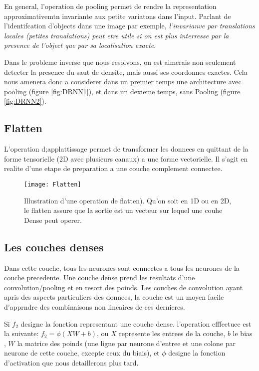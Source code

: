 En general, l'operation de pooling permet de rendre la representation approximativemtn invariante aux petite variatons dans l'input. Parlant de l'identifcation d'objects dans une image par exemple, \textit{l'invarianve par translations locales (petites tranalations) peut etre utile si on est plus interresse par la presence de l'object que par sa localisation exacte}\parencite[321ff.]{Reference5}.

Dans le probleme inverse que nous resolvons, on est aimerais non seulement detecter la presence du saut de densite, mais aussi ses coordonnes exactes. Cela nous amenera donc a considerer dans un premier temps une architecture avec pooling (figure \ref{fig:DRNN1}), et dans un dexieme temps, sans Pooling (figure \ref{fig:DRNN2}).
 
\subsection{Flatten}
L'operation d;applattissage permet de transformer les donnees en quittant de la forme tensorielle (2D avec plusieurs canaux) a une forme vectorielle. Il s'agit en realite d'une etape de preparation a une couche complement connectee.

\begin{figure}[!h] 
\centering
\texttt{[image: Flatten]}
\decoRule
\caption[Flatten]{Illustration d'une operation de flatten). Qu'on soit en 1D ou en 2D, le flatten assure que la sortie est un vecteur sur lequel une couhe Dense peut operer.}
\label{fig:Flatten}
\end{figure} 

\subsection{Les couches denses}
Dans cette couche, tous les neurones sont connectes a tous les neurones de la couche precedente. Une couche dense prend les resultats d'une convolution/pooling et en resort des poinds. Les couches de convolution ayant apris des aspects particuliers des donnees, la couche est un moyen facile d'apprndre des combinaisons non lineaires de ces dernieres.

Si $f_2$ designe la fonction representant une couche dense. l'operation efffectuee est la suivante: $f_2=\phi(XW+b)$, ou $X$ represente les entrees de la couche, $b$ le bias , $W$ la matrice des poinds (une ligne par neurone d'entree et une colone par neurone de cette couche, excepte ceux du biais), et $\phi$ designe la fonction d'activation que nous detaillerons plus tard. \parencite[286]{Reference8}

